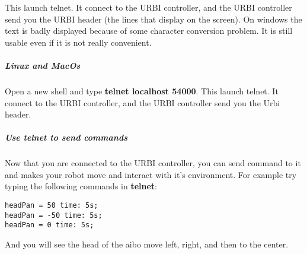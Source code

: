 This launch telnet. It connect to the URBI controller, and the URBI
controller send you the URBI header (the lines that display on the
screen). On windows the text is badly displayed because of some
character conversion problem. It is still usable even if it is not
really convenient.




\subparagraph{Linux and MacOs}
\label{webots.firstrun.clientsoftware.telnet.linuxandmacos}%

Open a new shell and type \textbf{telnet localhost 54000}.  This
launch telnet. It connect to the URBI controller, and the URBI
controller send you the Urbi header.




\subparagraph{Use telnet to send commands}
\label{webots.firstrun.clientsoftware.telnet.usetelnet}%

Now that you are connected to the URBI controller, you can send
command to it and makes your robot move and interact with it's
environment. For example try typing the following commands in
\textbf{telnet}:

\begin{lstlisting}[firstnumber=1,]
headPan = 50 time: 5s;
headPan = -50 time: 5s;
headPan = 0 time: 5s;
\end{lstlisting}
And you will see the head of the aibo move left, right, and then to
the center.




